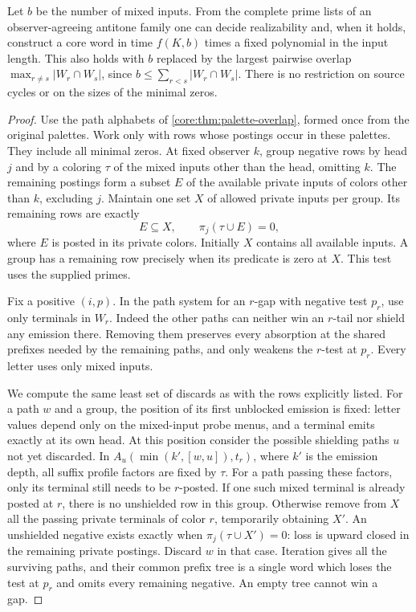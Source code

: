 \begin{theorem}
\label{core:thm:compact-overlap-guards}
Let $b$ be the number of mixed inputs. From the complete prime lists
of an observer-agreeing antitone family one can decide realizability
and, when it holds, construct a core word in time
$f(K,b)$ times a fixed polynomial in the input length. This also
holds with $b$ replaced by the largest pairwise overlap
$\max_{r\ne s}|W_r\cap W_s|$, since $b\le\sum_{r<s}|W_r\cap W_s|$.
There is no restriction on source cycles or on the sizes of the
minimal zeros.
\end{theorem}
\begin{proof}
Use the path alphabets of \cref{core:thm:palette-overlap}, formed once
from the original palettes. Work only with rows whose postings occur
in these palettes. They include all minimal zeros. At fixed observer
$k$, group negative rows by head $j$ and by a coloring $\tau$ of
the mixed inputs other than the head, omitting $k$. The remaining
postings form a subset $E$ of the available private inputs of colors
other than $k$, excluding $j$. Maintain one set $X$ of allowed private
inputs per group. Its remaining rows are exactly
\[
    E\subseteq X,\qquad \pi_j(\tau\cup E)=0 ,
\]
where $E$ is posted in its private colors. Initially $X$ contains
all available inputs. A group has a remaining row precisely when
its predicate is zero at $X$. This test uses the supplied primes.

Fix a positive $(i,p)$. In the path system for an $r$-gap with
negative test $p_r$, use only terminals in $W_r$. Indeed the other
paths can neither win an $r$-tail nor shield any emission there.
Removing them preserves every absorption at the shared prefixes
needed by the remaining paths, and only weakens the $r$-test at $p_r$.
Every letter uses only mixed inputs.

We compute the same least set of discards as with the rows explicitly
listed. For a path $w$ and a group, the position of its first unblocked
emission is fixed: letter values depend only on the mixed-input
probe menus, and a terminal emits exactly at its own head. At this
position consider the possible shielding paths $u$ not yet discarded.
In $A_u(\min(k',[w,u]),t_r)$, where $k'$ is the emission depth,
all suffix profile factors are fixed by $\tau$. For a path passing
these factors, only its terminal still needs to be $r$-posted.
If one such mixed terminal is already posted at $r$, there is no
unshielded row in this group. Otherwise remove from $X$ all the
passing private terminals of color $r$, temporarily obtaining $X'$.
An unshielded negative exists exactly when $\pi_j(\tau\cup X')=0$:
loss is upward closed in the remaining private postings. Discard
$w$ in that case. Iteration gives all the surviving paths, and
their common prefix tree is a single word which loses the test
at $p_r$ and omits every remaining negative. An empty tree cannot
win a gap.


\end{proof}
